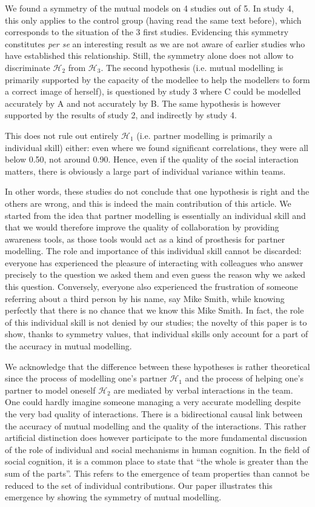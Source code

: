 \documentclass[natbib]{svjour3}
\newcommand{\ie}{i.e.\xspace}
\newcommand{\A}{A\xspace}
\newcommand{\B}{B\xspace}
\newcommand{\C}{C\xspace}
\begin{document}
We found a symmetry of the mutual models on 4 studies out of 5. In study 4, this
only applies to the control group (having read the same text before), which
corresponds to the situation of the 3 first studies. Evidencing this symmetry
constitutes \textit{per se} an interesting result as we are not aware of earlier
studies who have established this relationship.
Still, the symmetry alone does not allow to discriminate $\mathcal{H}_{2}$ from
$\mathcal{H}_{3}$. The second hypothesis (\ie mutual modelling is primarily
supported by the capacity of the modellee to help the modellers to form a
correct image of herself), is questioned by study 3 where \C could be modelled
accurately by \A and not accurately by \B. The same hypothesis is however
supported by the results of study 2, and indirectly by study 4.

This does not rule out entirely $\mathcal{H}_{1}$ (\ie partner modelling is
primarily a individual skill) either: even where we found significant
correlations, they were all below 0.50, not around 0.90.  Hence, even if the
quality of the social interaction matters, there is obviously a large part of
individual variance within teams.

In other words, these studies do not conclude that one hypothesis is right and the
others are wrong, and this is indeed the main contribution of this article. We
started from the idea that partner modelling is essentially an individual skill
and that we would therefore improve the quality of collaboration by providing 
awareness tools, as those tools would act as a kind of prosthesis for partner
modelling. The role and importance of this individual skill cannot be discarded:
everyone has experienced the pleasure of interacting with colleagues who answer precisely to the question
we asked them and even guess the reason why we asked this question. Conversely,
everyone also experienced the frustration of someone referring about a third
person by his name, say Mike Smith, while knowing perfectly that there is no
chance that we know this Mike Smith. In fact, the role of this individual skill is
not denied by our studies; the novelty of this paper is to show, thanks to
symmetry values, that individual skills only account for a part of the accuracy
in mutual modelling.

We acknowledge that the difference between these hypotheses is rather
theoretical since the  process of modelling one's partner $\mathcal{H}_{1}$ and
the process of helping one's partner to model oneself $\mathcal{H}_{2}$ are
mediated by verbal interactions in the team. One could hardly imagine someone
managing a very accurate modelling despite the very bad quality of interactions.
There is a bidirectional causal link between the accuracy of mutual modelling
and the quality of the interactions. This rather artificial distinction does
however participate to the more fundamental discussion of the role of individual
and social mechanisms in human cognition. In the field of social cognition, it
is a common place to state that ``the whole is greater than the sum of the
parts''.  This refers to the emergence of team properties than cannot be reduced
to the set of individual contributions. Our paper illustrates this emergence by
showing the symmetry of mutual modelling.
\end{document}
